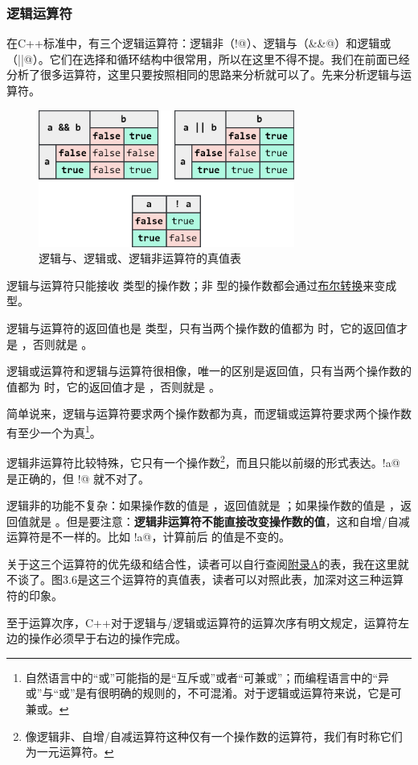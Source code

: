\subsubsection*{逻辑运算符}
在C++标准中，有三个逻辑运算符：逻辑非（\lstinline@!@）、逻辑与（\lstinline@&&@）和逻辑或（\lstinline@||@）。它们在选择和循环结构中很常用，所以在这里不得不提。我们在前面已经分析了很多运算符，这里只要按照相同的思路来分析就可以了。先来分析逻辑与运算符。\par
\begin{figure}[htbp]
    \centering
    \includegraphics[width=0.75\textwidth]{../images/generalized_parts/03_truth_table_of_logic_operators.drawio.png}
    \caption{逻辑与、逻辑或、逻辑非运算符的真值表}
\end{figure}
逻辑与运算符只能接收 \lstinline@bool@ 类型的操作数；非 \lstinline@bool@ 型的操作数都会通过\hyperref[con:boolean_conversions]{布尔转换}来变成 \lstinline@bool@ 型。\par
逻辑与运算符的返回值也是 \lstinline@bool@ 类型，只有当两个操作数的值都为 \lstinline@true@ 时，它的返回值才是 \lstinline@true@，否则就是 \lstinline@false@。\par
逻辑或运算符和逻辑与运算符很相像，唯一的区别是返回值，只有当两个操作数的值都为 \lstinline@false@ 时，它的返回值才是 \lstinline@false@，否则就是 \lstinline@true@。\par
简单说来，逻辑与运算符要求两个操作数都为真，而逻辑或运算符要求两个操作数有至少一个为真\footnote{自然语言中的``或''可能指的是``互斥或''或者``可兼或''；而编程语言中的``异或''与``或''是有很明确的规则的，不可混淆。对于逻辑或运算符来说，它是可兼或。}。\par
逻辑非运算符比较特殊，它只有一个操作数\footnote{像逻辑非、自增/自减运算符这种仅有一个操作数的运算符，我们有时称它们为一元运算符。}，而且只能以前缀的形式表达。\lstinline@!a@ 是正确的，但 \lstinline@a!@ 就不对了。\par
逻辑非的功能不复杂：如果操作数的值是 \lstinline@true@，返回值就是 \lstinline@false@；如果操作数的值是 \lstinline@false@，返回值就是 \lstinline@true@。但是要注意：\textbf{逻辑非运算符不能直接改变操作数的值}，这和自增/自减运算符是不一样的。比如 \lstinline@!a@，计算前后 \lstinline@a@ 的值是不变的。\par
关于这三个运算符的优先级和结合性，读者可以自行查阅\hyperref[ch:appendix_A]{附录A}的表，我在这里就不谈了。图3.6是这三个运算符的真值表，读者可以对照此表，加深对这三种运算符的印象。\par
至于运算次序，C++对于逻辑与/逻辑或运算符的运算次序有明文规定，运算符左边的操作必须早于右边的操作完成。\par

